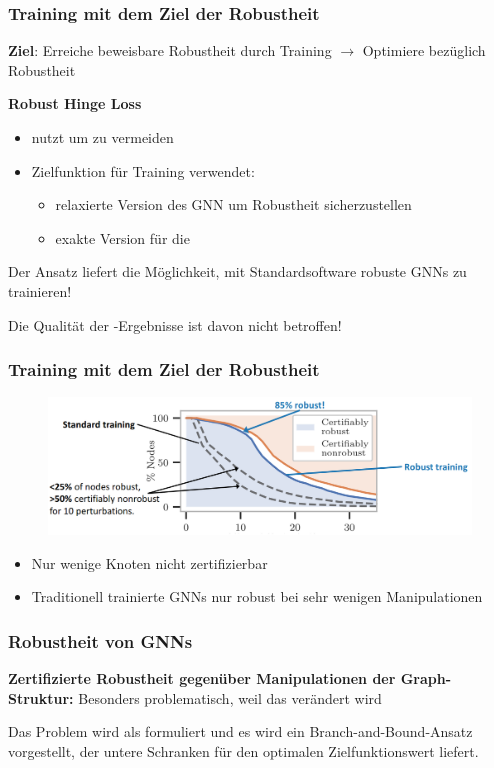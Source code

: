 \documentclass{beamer}
\begin{document}
\begin{frame}
  \frametitle{Training mit dem Ziel der Robustheit}

  \textbf{Ziel}: Erreiche beweisbare Robustheit durch Training\newline
  $\rightarrow$ Optimiere bezüglich Robustheit

  \textbf{Robust Hinge Loss}
  \begin{itemize}
    \item nutzt  um  zu vermeiden
    \item Zielfunktion für Training verwendet:
    \begin{itemize}
      \item relaxierte Version des GNN um Robustheit sicherzustellen
      \item exakte Version für die 
    \end{itemize}
  \end{itemize}  

  Der Ansatz liefert die Möglichkeit, mit Standardsoftware robuste GNNs zu trainieren!

  Die Qualität der -Ergebnisse ist davon nicht betroffen!
\end{frame}

\begin{frame}
  \frametitle{Training mit dem Ziel der Robustheit}
  \begin{figure}
    \centering
    \includegraphics[width=\textwidth]{img/robust_training.png}
    \caption*{ \cite{}}
  \end{figure}
  \begin{itemize}
    \item Nur wenige Knoten nicht zertifizierbar
    \item Traditionell trainierte GNNs nur robust bei sehr wenigen Manipulationen
  \end{itemize}
\end{frame}

\begin{frame}
  \frametitle{Robustheit von GNNs}
  \textbf{Zertifizierte Robustheit gegenüber Manipulationen der Graph-Struktur:}\newline
  Besonders problematisch, weil das  verändert wird

  Das Problem wird als  formuliert und es wird ein Branch-and-Bound-Ansatz vorgestellt, der
  untere Schranken für den optimalen Zielfunktionswert liefert.
\end{frame}
\end{document}
